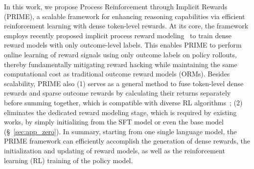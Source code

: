 In this work, we propose Process Reinforcement through Implicit Rewards (PRIME), a scalable framework for enhancing reasoning capabilities via efficient reinforcement learning with dense token-level rewards. 
At its core, the framework employs recently proposed implicit process reward modeling~\citep{yuan2024freeprocessrewardsprocess} to train dense reward models with only outcome-level labels.
This enables PRIME to perform online learning of reward signals using only outcome labels on policy rollouts, thereby fundamentally mitigating reward hacking while maintaining the same computational cost as traditional outcome reward models (ORMs).
Besides scalability, PRIME also (1) serves as a general method to fuse token-level dense rewards and sparse outcome rewards by calculating their returns separately before summing together, which is compatible with diverse RL algorithms~\citep{williams1992simple,Kool2019Buy4R,deepseek-math,ahmadian2024back,schulman2017proximal}; (2) eliminates the dedicated reward modeling stage, which is required by existing works, by simply initializing from the SFT model or even the base model (\S~\ref{sec:app_zero}).
In summary, starting from one single language model, the PRIME framework can efficiently accomplish the generation of dense rewards, the initialization and updating of reward models, as well as the reinforcement learning (RL) training of the policy model.




